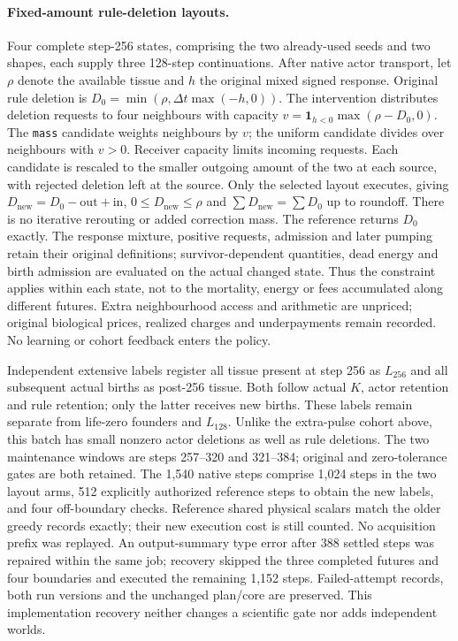 \paragraph{Fixed-amount rule-deletion layouts.}
Four complete step-256 states, comprising the two already-used seeds and two shapes, each supply three 128-step continuations. After native actor transport, let $\rho$ denote the available tissue and $h$ the original mixed signed response. Original rule deletion is $D_0=\min(\rho,\Delta t\max(-h,0))$. The intervention distributes deletion requests to four neighbours with capacity $v=\mathbf{1}_{h<0}\max(\rho-D_0,0)$. The \texttt{mass} candidate weights neighbours by $v$; the uniform candidate divides over neighbours with $v>0$. Receiver capacity limits incoming requests. Each candidate is rescaled to the smaller outgoing amount of the two at each source, with rejected deletion left at the source. Only the selected layout executes, giving $D_{\mathrm{new}}=D_0-\mathrm{out}+\mathrm{in}$, $0\leq D_{\mathrm{new}}\leq\rho$ and $\sum D_{\mathrm{new}}=\sum D_0$ up to roundoff. There is no iterative rerouting or added correction mass. The reference returns $D_0$ exactly. The response mixture, positive requests, admission and later pumping retain their original definitions; survivor-dependent quantities, dead energy and birth admission are evaluated on the actual changed state. Thus the constraint applies within each state, not to the mortality, energy or fees accumulated along different futures. Extra neighbourhood access and arithmetic are unpriced; original biological prices, realized charges and underpayments remain recorded. No learning or cohort feedback enters the policy.

Independent extensive labels register all tissue present at step 256 as $L_{256}$ and all subsequent actual births as post-256 tissue. Both follow actual $K$, actor retention and rule retention; only the latter receives new births. These labels remain separate from life-zero founders and $L_{128}$. Unlike the extra-pulse cohort above, this batch has small nonzero actor deletions as well as rule deletions. The two maintenance windows are steps 257--320 and 321--384; original and zero-tolerance gates are both retained. The 1,540 native steps comprise 1,024 steps in the two layout arms, 512 explicitly authorized reference steps to obtain the new labels, and four off-boundary checks. Reference shared physical scalars match the older greedy records exactly; their new execution cost is still counted. No acquisition prefix was replayed. An output-summary type error after 388 settled steps was repaired within the same job; recovery skipped the three completed futures and four boundaries and executed the remaining 1,152 steps. Failed-attempt records, both run versions and the unchanged plan/core are preserved. This implementation recovery neither changes a scientific gate nor adds independent worlds.

